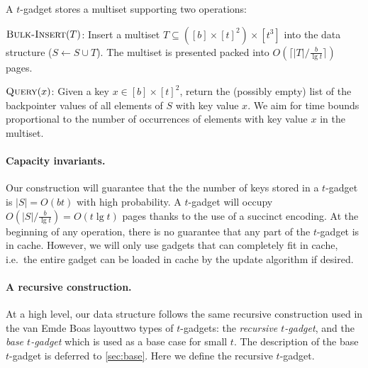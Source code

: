 \documentclass[letterpaper,11pt]{article}
\newenvironment{description*}{\vspace{-1ex}\begin{description}\setlength{\itemsep}{-0.5ex}\setlength{\parsep}{0pt}}{\end{description}}
\newcommand{\proc}[1]{\textnormal{\scshape#1}}
\begin{document}
A $t$-gadget stores a multiset supporting two operations:
\begin{description*}
\item[$\proc{Bulk-Insert}(T)$:] Insert a multiset $T \subseteq ([b]\times
  [t]^2)\times [t^3]$ into the data structure ($S \leftarrow S \cup T$). The
  multiset is presented packed into  $O(\lceil |T| / \frac{b}{\lg t}
  \rceil)$ pages.

\item[$\proc{Query}(x)$:] Given a key $x \in [b]\times [t]^2$, return
  the (possibly empty) list of the backpointer values of all elements
  of $S$ with key value $x$. We aim for time bounds proportional to
  the number of occurrences of elements with key value $x$ in the
  multiset.

\end{description*}

\paragraph{Capacity invariants.}
Our construction will guarantee that the the number of keys stored in
a $t$-gadget is $|S| = O(bt)$ with high probability.  A $t$-gadget
will occupy $O(|S| / \frac{b}{\lg t}) = O(t\lg t)$ pages thanks to the
use of a succinct encoding. At the beginning of any operation, there
is no guarantee that any part of the $t$-gadget is in cache.
However, we will only use gadgets that can completely fit in cache,
i.e.~the entire gadget can be loaded in cache by the update algorithm
if desired.






















\paragraph{A recursive construction.}
At a high level, our data structure follows the same recursive
construction used in the van Emde Boas layouttwo types of $t$-gadgets: the \emph{recursive $t$-gadget}, and the
\emph{base $t$-gadget} which is used as a base case for small $t$. The
description of the base $t$-gadget is deferred to \ref{sec:base}. Here
we define the recursive $t$-gadget.
\end{document}
